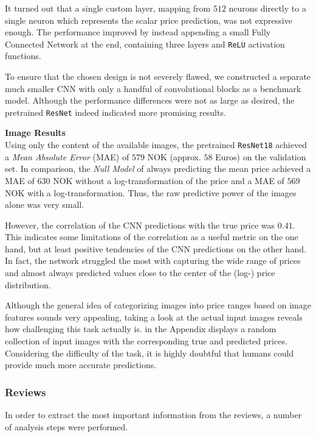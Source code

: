 It turned out that a single custom layer, mapping from $512$ neurons directly to a single neuron which represents the scalar price prediction, was not expressive enough.
The performance improved by instead appending a small Fully Connected Network at the end, containing three layers and \texttt{ReLU} activation functions.

To ensure that the chosen design is not severely flawed, we constructed a separate much smaller CNN with only a handful of convolutional blocks as a benchmark model.
Although the performance differences were not as large as desired, the pretrained \texttt{ResNet} indeed indicated more promising results.


\textbf{Image Results} \\
Using only the content of the available images, the pretrained \texttt{ResNet18} achieved a \emph{Mean Absolute Error} (MAE) of $579$ NOK (approx. $58$ Euros) on the validation set.
In comparison, the \emph{Null Model} of always predicting the mean price achieved a MAE of $630$ NOK without a log-transformation of the price and a MAE of $569$ NOK with a log-transformation.
Thus, the raw predictive power of the images alone was very small.

However, the correlation of the CNN predictions with the true price was $0.41$.
This indicates some limitations of the correlation as a useful metric on the one hand, but at least positive tendencies of the CNN predictions on the other hand.
In fact, the network struggled the most with capturing the wide range of prices and almost always predicted values close to the center of the (log-) price distribution.

Although the general idea of categorizing images into price ranges based on image features sounds very appealing, taking a look at the actual input images reveals how challenging this task actually is.
 in the Appendix displays a random collection of input images with the corresponding true and predicted prices.
Considering the difficulty of the task, it is highly doubtful that humans could provide much more accurate predictions.


\subsubsection{Reviews}

In order to extract the most important information from the reviews, a number of analysis steps were performed.

